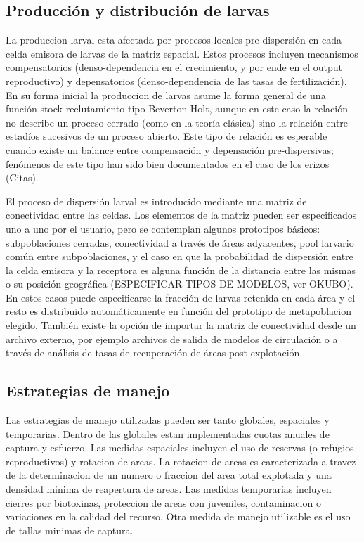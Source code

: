		\subsection{Producción y distribución de larvas}

			La produccion larval esta afectada por  procesos locales pre-dispersión en cada celda emisora de larvas de la matriz espacial. Estos procesos incluyen mecanismos compensatorios (denso-dependencia en el crecimiento, y por ende en el output reproductivo) y depensatorios (denso-dependencia de las tasas de fertilización). En su forma inicial la produccion de larvas asume la forma general de una función stock-reclutamiento tipo Beverton-Holt, aunque en este caso la relación no describe un proceso cerrado (como en la teoría clásica) sino la relación entre estadíos sucesivos de un proceso abierto. Este tipo de relación es esperable cuando existe un balance entre compensación y depensación pre-dispersivas; fenómenos de este tipo han sido bien documentados en el caso de los erizos (Citas).

			El proceso de dispersión larval es introducido mediante una matriz de conectividad entre las celdas. Los elementos de la matriz pueden ser especificados uno a uno por el usuario, pero se contemplan algunos prototipos básicos: subpoblaciones cerradas, conectividad a través de áreas adyacentes, pool larvario común entre subpoblaciones, y el caso en que la probabilidad de dispersión entre la celda emisora y la receptora es alguna función de la distancia entre las mismas o su posición geográfica (ESPECIFICAR TIPOS DE MODELOS, ver OKUBO). En estos casos puede especificarse la fracción de larvas retenida en cada área y el resto es distribuido automáticamente en función del prototipo de metapoblacion elegido. También existe la opción de importar la matriz de conectividad desde un archivo externo, por ejemplo archivos de salida de modelos de circulación o a través de análisis de tasas de recuperación de áreas post-explotación.

		\subsection{Estrategias de manejo}

			Las estrategias de manejo utilizadas pueden ser  tanto globales, espaciales y temporarias.
Dentro de las globales estan implementadas cuotas anuales de captura  y esfuerzo. Las medidas espaciales incluyen el uso de reservas (o refugios reproductivos) y rotacion de areas. La rotacion de areas es caracterizada a travez de la determinacion de un numero o fraccion del area total explotada y una densidad minima de reapertura de areas. Las medidas temporarias incluyen cierres por biotoxinas, proteccion de areas con juveniles, contaminacion o variaciones en la calidad del recurso. Otra medida de manejo utilizable es el uso de tallas minimas de captura.


